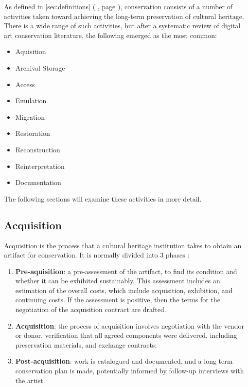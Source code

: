 As defined in \autoref{sec:definitions} ( , page \pageref{sec:definitions}), conservation consists of a number of activities taken toward achieving the long-term preservation of cultural heritage. There is a wide range of such activities, but after a systematic review of digital art conservation literature, the following emerged as the most common:

\begin{itemize}
    \item Aquisition
    \item Archival Storage
    \item Access
    \item Emulation
    \item Migration
    \item Restoration
    \item Reconstruction
    \item Reinterpretation
    \item Documentation
\end{itemize}

The following sections will examine these activities in more detail.

\subsection{Acquisition}

Acquisition is the process that a cultural heritage institution takes to obtain an artifact for conservation. It is normally divided into 3 phases \cite{ahtilaAcquiringMediaArt1998}:

\begin{enumerate}
    \item \textbf{Pre-aquisition}: a pre-assessment of the artifact, to find its condition and whether it can be exhibited sustainably. This assessment includes an estimation of the overall costs, which include acquisition, exhibition, and continuing costs. If the assessment is positive, then the terms for the negotiation of the acquisition contract are drafted.
    \item  \textbf{Acquisition}: the process of acquisition involves negotiation with the vendor or donor, verification that all agreed components were delivered, including preservation materials, and exchange contracts;
    \item  \textbf{Post-acquisition}: work is catalogued and documented, and a long term conservation plan is made, potentially informed by follow-up interviews with the artist.
\end{enumerate}

